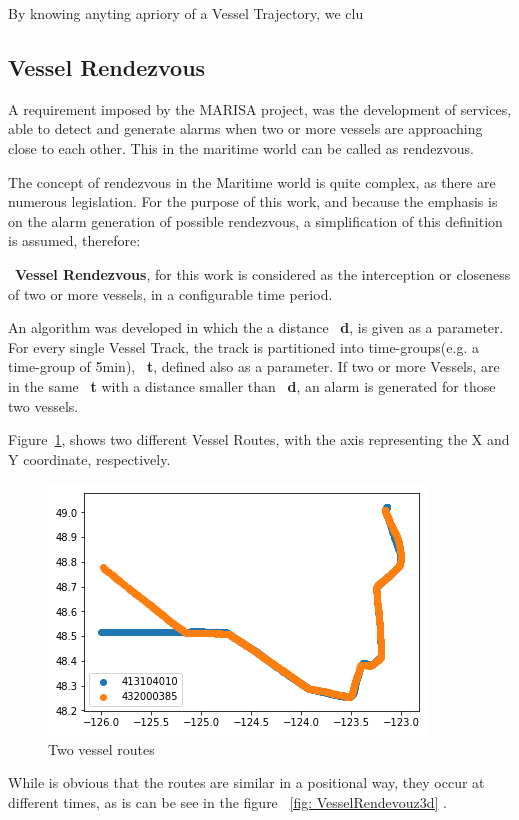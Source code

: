 By knowing anyting apriory of a Vessel Trajectory, we clu
\fi
\subsection{Vessel Rendezvous}
A requirement imposed by the MARISA project, was the development of services, able to detect and generate alarms when two or more vessels are approaching close to each other. This in the maritime world can be called as rendezvous.

The concept of rendezvous in the Maritime world is quite complex, as there are numerous legislation. For the purpose of this work, and because the emphasis is on the alarm generation of possible rendezvous, a simplification of this definition is assumed, therefore: 

~\textbf{Vessel Rendezvous}, for this work is considered as the interception or closeness of two or more vessels, in a configurable time period.

An algorithm was developed in which the a distance ~\textbf{d}, is given as a parameter. For every single Vessel Track, the track is partitioned into time-groups(e.g. a time-group of 5min), ~\textbf{t}, defined also as a parameter. If two or more Vessels, are in the same ~\textbf{t} with a distance smaller than ~\textbf{d}, an alarm is generated for those two vessels.

Figure~\ref{fig: VesselRendevouz2d}, shows two different Vessel Routes, with the axis representing the X and Y coordinate, respectively.

\begin{figure}[H]
	\centering
	\includegraphics[scale = .8]{figures/VesselRendevouz2d}
    \caption{Two vessel routes}
    \label{fig: VesselRendevouz2d}
\end{figure}

While is obvious that the routes are similar in a positional way, they occur at different times, as is can be see in the figure ~\ref{fig: VesselRendevouz3d} .

